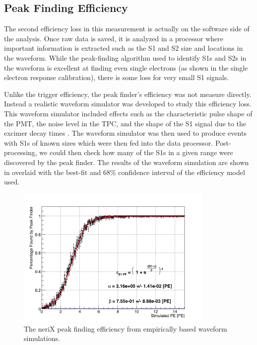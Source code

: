 \subsection{Peak Finding Efficiency}
\label{sec:nerix_pf_efficiency}

The second efficiency loss in this measurement is actually on the software side of the analysis.  Once raw data is saved, it is analyzed in a processor where important information is extracted such as the S1 and S2 size and locations in the waveform.  While the peak-finding algorithm used to identify S1s and S2s in the waveform is excellent at finding even single electrons (as shown in the single electron response calibration), there is some loss for very small S1 signals.  

Unlike the trigger efficiency, the peak finder's efficiency was not measure directly.  Instead a realistic waveform simulator was developed to study this efficiency loss.  This waveform simulator included effects such as the characteristic pulse shape of the PMT, the noise level in the TPC, and the shape of the S1 signal due to the excimer decay times \cite{hitachi1983effect}.  The waveform simulator was then used to produce events with S1s of known sizes which were then fed into the data processor.  Post-processing, we could then check how many of the S1s in a given range were discovered by the peak finder.  The results of the waveform simulation are shown in  overlaid with the best-fit and 68\% confidence interval of the efficiency model used.

\begin{figure}[t]
        \centering
	\includegraphics[width=0.85\textwidth]{nerix_peak_finder_efficiency}
	\caption{The neriX peak finding efficiency from empirically based waveform simulations.}
	\label{fig:nerix_peak_finder_efficiency}
\end{figure}





